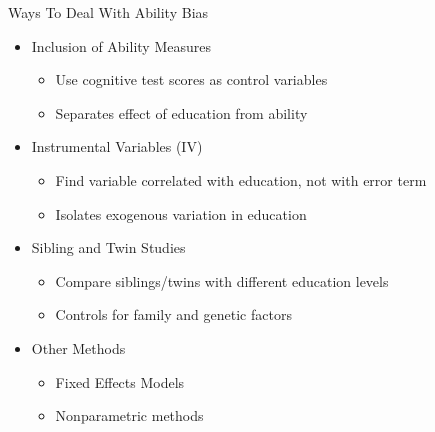 \documentclass{beamer} %
\begin{document}
\begin{frame}{Ways To Deal With Ability Bias}

    \begin{itemize}
        \item Inclusion of Ability Measures
              \begin{itemize}
                  \item Use cognitive test scores as control variables
                  \item Separates effect of education from ability
              \end{itemize}
        \item Instrumental Variables (IV)
              \begin{itemize}
                  \item Find variable correlated with education, not with error term
                  \item Isolates exogenous variation in education
              \end{itemize}
        \item Sibling and Twin Studies
              \begin{itemize}
                  \item Compare siblings/twins with different education levels
                  \item Controls for family and genetic factors
              \end{itemize}
        \item Other Methods
              \begin{itemize}
                  \item Fixed Effects Models
                  \item Nonparametric methods
              \end{itemize}
    \end{itemize}

\end{frame}
\end{document}
